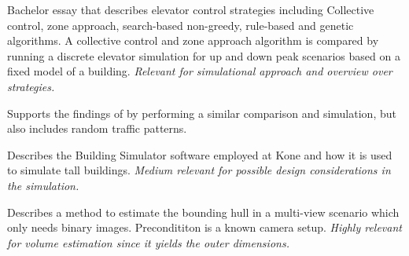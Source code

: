 


Bachelor essay that describes elevator control strategies including
Collective control, zone approach, search-based non-greedy, rule-based and genetic algorithms. A collective control and zone approach algorithm is compared by running a discrete elevator simulation for up and down peak scenarios based on a fixed model of a building. \emph{Relevant for simulational approach and overview over strategies.}


Supports the findings of \textcite{axelsson2013strategies} by performing a similar comparison and simulation, but also includes random traffic patterns. 



Describes the Building Simulator software employed at Kone and how it is used to simulate tall buildings.
\emph{Medium relevant for possible design considerations in the simulation.}

Describes a method to estimate the bounding hull in a multi-view scenario
which only needs binary images.
Precondititon is a known camera setup.
\emph{Highly relevant for volume estimation since it yields the outer dimensions.}

